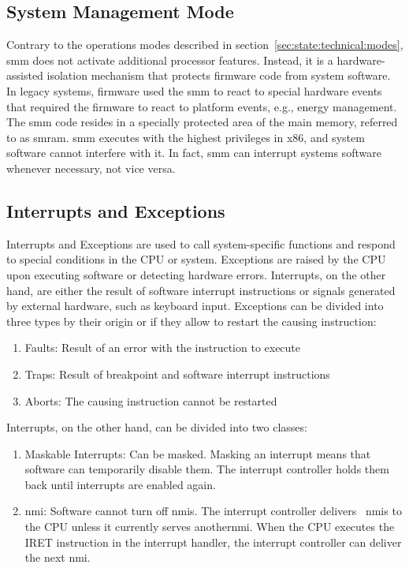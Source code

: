 \subsection{System Management Mode}
\label{sec:state:technical:smm}
Contrary to the operations modes described in
section~\ref{sec:state:technical:modes}, \gls{smm} does not activate additional
processor features. Instead, it is a hardware-assisted isolation mechanism that
protects firmware code from system software. In legacy systems, firmware used
the \gls{smm} to react to special hardware events that required the firmware to
react to platform events, e.g., energy management. The \gls{smm} code resides in
a specially protected area of the main memory, referred to as \gls{smram}.
\gls{smm} executes with the highest privileges in x86, and system software
cannot interfere with it. In fact, \gls{smm} can interrupt systems software
whenever necessary, not vice versa.

\subsection{Interrupts and Exceptions}
\label{sec:state:technical:interrupts}
Interrupts and Exceptions are used to call system-specific functions and respond
to special conditions in the CPU or system. Exceptions are raised by the CPU
upon executing software or detecting hardware errors. Interrupts, on the other
hand, are either the result of software interrupt instructions or signals
generated by external hardware, such as keyboard input. Exceptions can be
divided into three types by their origin or if they allow to restart the causing
instruction:
\begin{enumerate}
  \item Faults: Result of an error with the instruction to execute
  \item Traps: Result of breakpoint and software interrupt instructions
  \item Aborts: The causing instruction cannot be restarted
\end{enumerate}
Interrupts, on the other hand, can be divided into two classes:
\begin{enumerate}
  \item Maskable Interrupts: Can be masked. Masking an interrupt means that
    software can temporarily disable them. The interrupt controller holds
    them back until interrupts are enabled again.
  \item \Gls{nmi}: Software cannot turn off \glspl{nmi}. The interrupt
    controller delivers~ \glspl{nmi} to the CPU unless it currently serves
    another\gls{nmi}. When the CPU executes the IRET instruction in the
    interrupt handler, the interrupt controller can deliver the next \gls{nmi}.
\end{enumerate}

